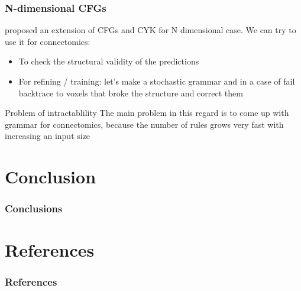 \documentclass{beamer}
\begin{document}
\begin{frame}
    \frametitle{N-dimensional CFGs}
    \cite{schlesinger2013ten} proposed an extension of CFGs and CYK for N dimensional case. We can try to use it
    for connectomics:
    \begin{itemize}
        \item To check the structural validity of the predictions
        \item For refining / training: let's make a stochastic grammar and in a case of fail backtrace to
              voxels that broke the structure and correct them
    \end{itemize}
    \begin{alertblock}{Problem of intractablility}
        The main problem in this regard is to come up with grammar for connectomics, because the
        number of rules grows very fast with increasing an input size
    \end{alertblock}
\end{frame}

\section*{Conclusion}

\begin{frame}
    \frametitle{Conclusions}
\end{frame}

\section*{References}

\begin{frame}[allowframebreaks]
    \frametitle{References}

    
    
\end{frame}
\end{document}
